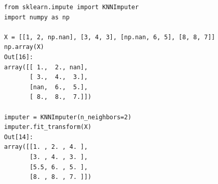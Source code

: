 \begin{lstlisting}[style=python]
from sklearn.impute import KNNImputer
import numpy as np

X = [[1, 2, np.nan], [3, 4, 3], [np.nan, 6, 5], [8, 8, 7]]
np.array(X)
Out[16]: 
array([[ 1.,  2., nan],
       [ 3.,  4.,  3.],
       [nan,  6.,  5.],
       [ 8.,  8.,  7.]])

imputer = KNNImputer(n_neighbors=2)
imputer.fit_transform(X)
Out[14]: 
array([[1. , 2. , 4. ],
       [3. , 4. , 3. ],
       [5.5, 6. , 5. ],
       [8. , 8. , 7. ]])
\end{lstlisting}

